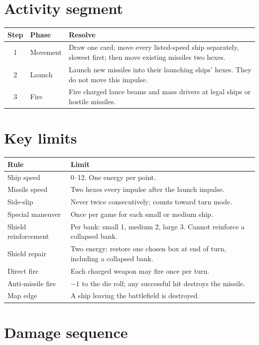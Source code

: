 \section{Activity segment}

\begin{center}
\begin{tabularx}{\linewidth}{c l Y}\toprule
Step & Phase & Resolve\\ & Movement & Draw one card; move every listed-speed ship separately, slowest first; then move existing missiles two hexes.\\
2 & Launch & Launch new missiles into their launching ships' hexes. They do not move this impulse.\\
3 & Fire & Fire charged lance beams and mass drivers at legal ships or hostile missiles.\\\bottomrule
\end{tabularx}
\end{center}

\section{Key limits}

\begin{tabularx}{\linewidth}{l Y}\toprule
Rule & Limit\\\midrule
Ship speed & 0--12. One energy per point.\\
Missile speed & Two hexes every impulse after the launch impulse.\\
Side-slip & Never twice consecutively; counts toward turn mode.\\
Special maneuver & Once per game for each small or medium ship.\\
Shield reinforcement & Per bank: small 1, medium 2, large 3. Cannot reinforce a collapsed bank.\\
Shield repair & Two energy; restore one chosen box at end of turn, including a collapsed bank.\\
Direct fire & Each charged weapon may fire once per turn.\\
Anti-missile fire & $-1$ to the die roll; any successful hit destroys the missile.\\
Map edge & A ship leaving the battlefield is destroyed.\\\bottomrule
\end{tabularx}

\section{Damage sequence}

